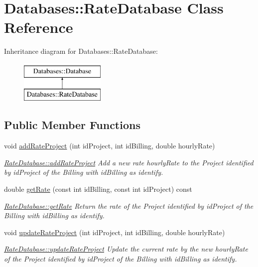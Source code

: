 \hypertarget{classDatabases_1_1RateDatabase}{}\section{Databases\+:\+:Rate\+Database Class Reference}
\label{classDatabases_1_1RateDatabase}
Inheritance diagram for Databases\+:\+:Rate\+Database\+:\begin{figure}[H]
\begin{center}
\leavevmode
\includegraphics[height=2.000000cm]{d9/d21/classDatabases_1_1RateDatabase}
\end{center}
\end{figure}
\subsection*{Public Member Functions}
\begin{DoxyCompactItemize}
\item 
void \hyperlink{classDatabases_1_1RateDatabase_aee32610b164a56b9aaa0a3acddfd8c27}{add\+Rate\+Project} (int id\+Project, int id\+Billing, double hourly\+Rate)
\begin{DoxyCompactList}\small\item\em \hyperlink{classDatabases_1_1RateDatabase_aee32610b164a56b9aaa0a3acddfd8c27}{Rate\+Database\+::add\+Rate\+Project} Add a new rate {\itshape hourly\+Rate} to the Project identified by {\itshape id\+Project} of the Billing with {\itshape id\+Billing} as identify. \end{DoxyCompactList}\item 
double \hyperlink{classDatabases_1_1RateDatabase_a2d3e0e20c108d335903b17d291fe1a13}{get\+Rate} (const int id\+Billing, const int id\+Project) const 
\begin{DoxyCompactList}\small\item\em \hyperlink{classDatabases_1_1RateDatabase_a2d3e0e20c108d335903b17d291fe1a13}{Rate\+Database\+::get\+Rate} Return the rate of the Project identified by {\itshape id\+Project} of the Billing with {\itshape id\+Billing} as identify. \end{DoxyCompactList}\item 
void \hyperlink{classDatabases_1_1RateDatabase_a48019f4138b2a3bc3cbd144b1dec6abc}{update\+Rate\+Project} (int id\+Project, int id\+Billing, double hourly\+Rate)
\begin{DoxyCompactList}\small\item\em \hyperlink{classDatabases_1_1RateDatabase_a48019f4138b2a3bc3cbd144b1dec6abc}{Rate\+Database\+::update\+Rate\+Project} Update the current rate by the new {\itshape hourly\+Rate} of the Project identified by {\itshape id\+Project} of the Billing with {\itshape id\+Billing} as identify. \end{DoxyCompactList}\end{DoxyCompactItemize}
